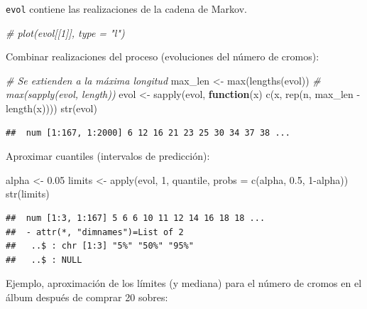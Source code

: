 \documentclass[
]{book}
\newenvironment{Shaded}{\begin{snugshade}}{\end{snugshade}}
\newcommand{\AttributeTok}[1]{\textcolor[rgb]{0.77,0.63,0.00}{#1}}
\newcommand{\CommentTok}[1]{\textcolor[rgb]{0.56,0.35,0.01}{\textit{#1}}}
\newcommand{\ControlFlowTok}[1]{\textcolor[rgb]{0.13,0.29,0.53}{\textbf{#1}}}
\newcommand{\DecValTok}[1]{\textcolor[rgb]{0.00,0.00,0.81}{#1}}
\newcommand{\FloatTok}[1]{\textcolor[rgb]{0.00,0.00,0.81}{#1}}
\newcommand{\FunctionTok}[1]{\textcolor[rgb]{0.00,0.00,0.00}{#1}}
\newcommand{\NormalTok}[1]{#1}
\newcommand{\OtherTok}[1]{\textcolor[rgb]{0.56,0.35,0.01}{#1}}
\newcommand{\SpecialCharTok}[1]{\textcolor[rgb]{0.00,0.00,0.00}{#1}}
\theoremstyle{break}
\theoremstyle{nonumberplain}
\begin{document}
\texttt{evol} contiene las realizaciones de la cadena de Markov.

\begin{Shaded}
\begin{Highlighting}[]
\CommentTok{\# plot(evol[[1]], type = "l")}
\end{Highlighting}
\end{Shaded}

Combinar realizaciones del proceso (evoluciones del número de cromos):

\begin{Shaded}
\begin{Highlighting}[]
\CommentTok{\# Se extienden a la máxima longitud}
\NormalTok{max\_len }\OtherTok{\textless{}{-}} \FunctionTok{max}\NormalTok{(}\FunctionTok{lengths}\NormalTok{(evol)) }\CommentTok{\# max(sapply(evol, length))}
\NormalTok{evol }\OtherTok{\textless{}{-}} \FunctionTok{sapply}\NormalTok{(evol, }\ControlFlowTok{function}\NormalTok{(x) }\FunctionTok{c}\NormalTok{(x, }\FunctionTok{rep}\NormalTok{(n, max\_len }\SpecialCharTok{{-}} \FunctionTok{length}\NormalTok{(x))))}
\FunctionTok{str}\NormalTok{(evol)}
\end{Highlighting}
\end{Shaded}

\begin{verbatim}
##  num [1:167, 1:2000] 6 12 16 21 23 25 30 34 37 38 ...
\end{verbatim}

Aproximar cuantiles (intervalos de predicción):

\begin{Shaded}
\begin{Highlighting}[]
\NormalTok{alpha }\OtherTok{\textless{}{-}} \FloatTok{0.05}
\NormalTok{limits }\OtherTok{\textless{}{-}} \FunctionTok{apply}\NormalTok{(evol, }\DecValTok{1}\NormalTok{, quantile, }\AttributeTok{probs =} \FunctionTok{c}\NormalTok{(alpha, }\FloatTok{0.5}\NormalTok{, }\DecValTok{1}\SpecialCharTok{{-}}\NormalTok{alpha))}
\FunctionTok{str}\NormalTok{(limits)}
\end{Highlighting}
\end{Shaded}

\begin{verbatim}
##  num [1:3, 1:167] 5 6 6 10 11 12 14 16 18 18 ...
##  - attr(*, "dimnames")=List of 2
##   ..$ : chr [1:3] "5%" "50%" "95%"
##   ..$ : NULL
\end{verbatim}

Ejemplo, aproximación de los límites (y mediana) para el número de cromos en el álbum después de comprar 20 sobres:
\end{document}

